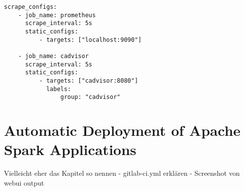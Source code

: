 \begin{lstlisting}[label=lst:06_computing_am_prom-config, caption=Prometheus target configuration in YAML syntax]
scrape_configs:
    - job_name: prometheus
      scrape_interval: 5s
      static_configs:
          - targets: ["localhost:9090"]
 
    - job_name: cadvisor
      scrape_interval: 5s
      static_configs:
          - targets: ["cadvisor:8080"]
            labels:
                group: "cadvisor"
\end{lstlisting}


\section{Automatic Deployment of Apache Spark Applications}
Vielleicht eher das Kapitel so nennen
- gitlab-ci.yml erklären
- Screenshot von webui output
